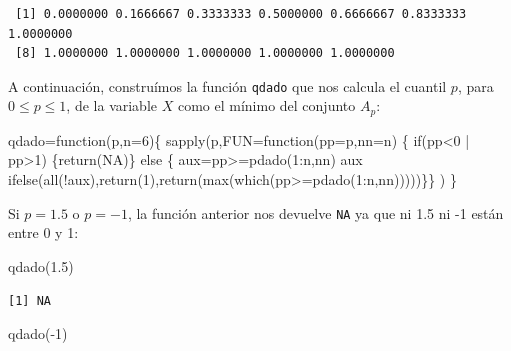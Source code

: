 \documentclass[
  letterpaper,
  DIV=11,
  numbers=noendperiod]{scrreprt}
\newenvironment{Shaded}{\begin{snugshade}}{\end{snugshade}}
\newcommand{\AttributeTok}[1]{\textcolor[rgb]{0.40,0.45,0.13}{#1}}
\newcommand{\ConstantTok}[1]{\textcolor[rgb]{0.56,0.35,0.01}{#1}}
\newcommand{\ControlFlowTok}[1]{\textcolor[rgb]{0.00,0.23,0.31}{#1}}
\newcommand{\DecValTok}[1]{\textcolor[rgb]{0.68,0.00,0.00}{#1}}
\newcommand{\FloatTok}[1]{\textcolor[rgb]{0.68,0.00,0.00}{#1}}
\newcommand{\FunctionTok}[1]{\textcolor[rgb]{0.28,0.35,0.67}{#1}}
\newcommand{\NormalTok}[1]{\textcolor[rgb]{0.00,0.23,0.31}{#1}}
\newcommand{\OtherTok}[1]{\textcolor[rgb]{0.00,0.23,0.31}{#1}}
\newcommand{\SpecialCharTok}[1]{\textcolor[rgb]{0.37,0.37,0.37}{#1}}
\begin{document}
\begin{verbatim}
 [1] 0.0000000 0.1666667 0.3333333 0.5000000 0.6666667 0.8333333 1.0000000
 [8] 1.0000000 1.0000000 1.0000000 1.0000000 1.0000000
\end{verbatim}

A continuación, construímos la función \texttt{qdado} que nos calcula el
cuantil \(p\), para \(0\leq p\leq 1\), de la variable \(X\) como el
mínimo del conjunto \(A_p\):

\begin{Shaded}
\begin{Highlighting}[]
\NormalTok{qdado}\OtherTok{=}\ControlFlowTok{function}\NormalTok{(p,}\AttributeTok{n=}\DecValTok{6}\NormalTok{)\{}
\FunctionTok{sapply}\NormalTok{(p,}\AttributeTok{FUN=}\ControlFlowTok{function}\NormalTok{(}\AttributeTok{pp=}\NormalTok{p,}\AttributeTok{nn=}\NormalTok{n) }
\NormalTok{  \{}
  \ControlFlowTok{if}\NormalTok{(pp}\SpecialCharTok{\textless{}}\DecValTok{0} \SpecialCharTok{|}\NormalTok{ pp}\SpecialCharTok{\textgreater{}}\DecValTok{1}\NormalTok{) \{}\FunctionTok{return}\NormalTok{(}\ConstantTok{NA}\NormalTok{)\}}
  \ControlFlowTok{else}\NormalTok{ \{}
\NormalTok{  aux}\OtherTok{=}\NormalTok{pp}\SpecialCharTok{\textgreater{}=}\FunctionTok{pdado}\NormalTok{(}\DecValTok{1}\SpecialCharTok{:}\NormalTok{n,nn)}
\NormalTok{  aux}
  \FunctionTok{ifelse}\NormalTok{(}\FunctionTok{all}\NormalTok{(}\SpecialCharTok{!}\NormalTok{aux),}\FunctionTok{return}\NormalTok{(}\DecValTok{1}\NormalTok{),}\FunctionTok{return}\NormalTok{(}\FunctionTok{max}\NormalTok{(}\FunctionTok{which}\NormalTok{(pp}\SpecialCharTok{\textgreater{}=}\FunctionTok{pdado}\NormalTok{(}\DecValTok{1}\SpecialCharTok{:}\NormalTok{n,nn)))))\}\}}
\NormalTok{)}
\NormalTok{\}}
\end{Highlighting}
\end{Shaded}

Si \(p=1.5\) o \(p=-1\), la función anterior nos devuelve \texttt{NA} ya
que ni 1.5 ni -1 están entre 0 y 1:

\begin{Shaded}
\begin{Highlighting}[]
\FunctionTok{qdado}\NormalTok{(}\FloatTok{1.5}\NormalTok{)}
\end{Highlighting}
\end{Shaded}

\begin{verbatim}
[1] NA
\end{verbatim}

\begin{Shaded}
\begin{Highlighting}[]
\FunctionTok{qdado}\NormalTok{(}\SpecialCharTok{{-}}\DecValTok{1}\NormalTok{)}
\end{Highlighting}
\end{Shaded}
\end{document}

